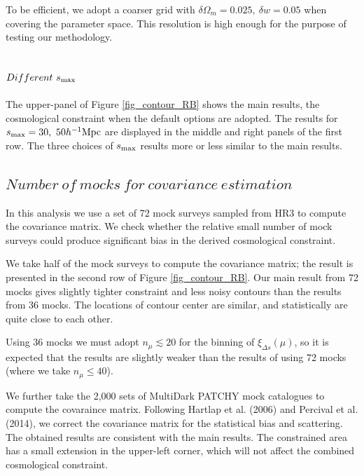 \documentclass[iop]{emulateapj}
\begin{document}
To be efficient, we adopt a coarser grid with $\delta \Omega_m=0.025,\ \delta w=0.05$ when covering the parameter space.
This resolution is high enough for the purpose of testing our methodology.


\subsection{$Different\ s_{\rm max}$}

The upper-panel of Figure \ref{fig_contour_RB} shows the main results, 
the cosmological constraint when the default options are adopted. %
The results for $s_{\rm max}=30,\ 50 h^{-1}{\rm Mpc}$ are displayed in the middle and right panels of the first row.
The three choices of $s_{\rm max}$ results more or less similar to the main results.

\subsection{$Number\ of\ mocks\ for\ covariance\ estimation$}

In this analysis we use a set of 72 mock surveys sampled from HR3 to compute the covariance matrix.
We check whether the relative small number of mock surveys could produce significant bias in the derived cosmological constraint.

We take half of the mock surveys to compute the covariance matrix;
the result is presented in the second row of Figure \ref{fig_contour_RB}.
Our main result from 72 mocks gives slightly tighter constraint and less noisy contours than the results from 36 mocks.
The locations of contour center are similar, and statistically are quite close to each other.

Using 36 mocks we must adopt $n_\mu\lesssim20$ for the binning of $\xi_{\Delta s}(\mu)$,
so it is expected that the results are slightly weaker than the results of using 72 mocks (where we take $n_{\mu}\leq40$).

We further take the 2,000 sets of MultiDark PATCHY mock catalogues \citep{MDPATCHY} to compute the covaraince matrix.
Following Hartlap et al. (2006) and Percival et al. (2014), we correct the covariance matrix
for the statistical bias and scattering.
The obtained results are consistent with the main results.
The constrained area has a small extension in the upper-left corner, which will not affect the combined cosmological constraint.
\end{document}
